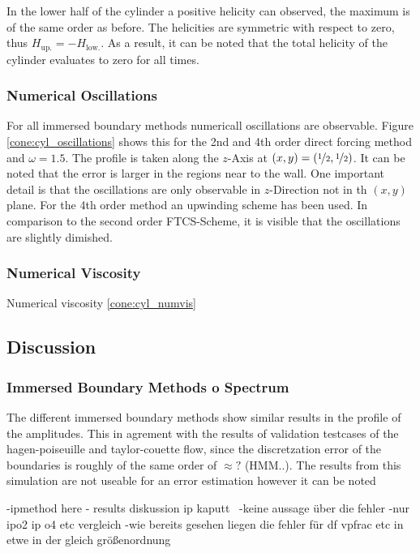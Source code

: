 In the lower half of the cylinder a positive helicity can observed, the maximum is of the same order as before.
The helicities are symmetric with respect to zero, thus $H_{\text{up.}} = -H_{\text{low.}}$.
As a result, it can be noted that the total helicity of the cylinder evaluates to zero for all times.

\subsubsection{Numerical Oscillations}

For all immersed boundary methods numericall oscillations are observable.
Figure \ref{cone:cyl_oscillations} shows this for the 2nd and 4th order direct forcing method and $\omega=1.5$.
The profile is taken along the $z$-Axis at $(x,y)=(\nicefrac{1}{2},\nicefrac{1}{2})$.
It can be noted that the error is larger in the regions near to the wall.
One important detail is that the oscillations are only observable in $z$-Direction not
in th $(x,y)$ plane.
For the 4th order method an upwinding scheme has been used. In comparison to the second order FTCS-Scheme,
it is visible that the oscillations are slightly dimished.

\subsubsection{Numerical Viscosity}
Numerical viscosity  \ref{cone:cyl_numvis}

\clearpage

\subsection{Discussion}

\subsubsection{Immersed Boundary Methods o Spectrum}

The different immersed boundary methods show similar results in the profile of the amplitudes.
This in agrement with the results of validation testcases of the hagen-poiseuille and
taylor-couette flow, since the discretzation error of the boundaries is roughly of the same order of $\approx?$ (HMM..).
The results from this simulation are not useable for an error estimation however it can be noted

-ipmethod here
- results diskussion ip kaputt \
-keine aussage über die fehler
-nur ipo2 ip o4 etc vergleich
-wie bereits gesehen liegen die fehler für df vpfrac etc in etwe in der gleich größenordnung

